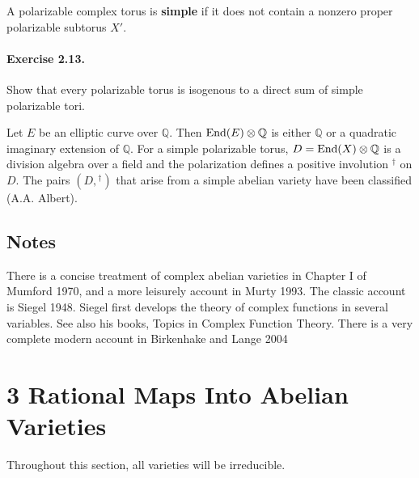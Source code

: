 A polarizable complex torus is \textbf{simple} if it does not contain a
nonzero proper polarizable subtorus $X'$.

\paragraph{Exercise 2.13.}
Show that every polarizable torus is isogenous to a direct sum of simple
polarizable tori.

Let $E$ be an elliptic curve over $\mathbb{Q}$. Then
$\operatorname{End}(E) \otimes \mathbb{Q}$ is either $\mathbb{Q}$ or a quadratic imaginary
extension of $\mathbb{Q}$. For a simple polarizable torus,
$D = \operatorname{End}(X) \otimes \mathbb{Q}$ is a division algebra over a field and the
polarization defines a positive involution ${}^{\dagger}$ on $D$. The pairs
$(D, {}^{\dagger})$ that arise from a simple abelian variety have been
classified (A.A. Albert).

\subsection*{Notes}

There is a concise treatment of complex abelian varieties in Chapter I of
Mumford 1970, and a more leisurely account in Murty 1993. The classic
account is Siegel 1948. Siegel first develops the theory of complex
functions in several variables. See also his books, Topics in Complex
Function Theory. There is a very complete modern account in Birkenhake and
Lange 2004

\section*{3 \quad Rational Maps Into Abelian Varieties}

Throughout this section, all varieties will be irreducible.

